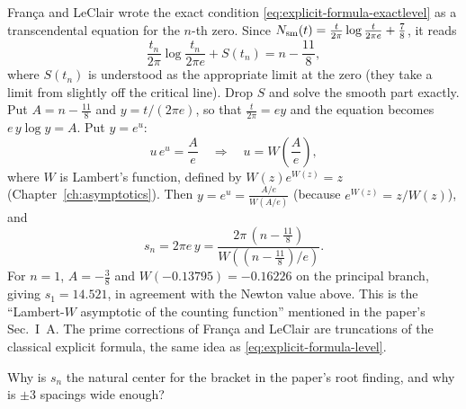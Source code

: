 Fran\c{c}a and LeClair \cite{francaleclair,leclair} wrote the exact condition \cref{eq:explicit-formula-exactlevel} as a transcendental equation for the $n$-th zero. Since $N_{\mathrm{sm}}(t)=\frac{t}{2\pi}\log\frac{t}{2\pi e}+\frac78$, it reads
\begin{equation}
\frac{t_n}{2\pi}\log\frac{t_n}{2\pi e}+S(t_n)=n-\frac{11}{8},
\label{eq:explicit-formula-fl}
\end{equation}
where $S(t_n)$ is understood as the appropriate limit at the zero (they take a limit from slightly off the critical line). Drop $S$ and solve the smooth part exactly. Put $A=n-\frac{11}{8}$ and $y=t/(2\pi e)$, so that $\frac{t}{2\pi}=ey$ and the equation becomes $e\,y\log y=A$. Put $y=e^{u}$:
\[
u\,e^{u}=\frac{A}{e}\quad\Longrightarrow\quad u=W\!\left(\frac Ae\right),
\]
where $W$ is Lambert's function, defined by $W(z)e^{W(z)}=z$ (Chapter~\ref{ch:asymptotics}). Then $y=e^{u}=\frac{A/e}{W(A/e)}$ (because $e^{W(z)}=z/W(z)$), and
\begin{equation}
s_n=2\pi e\,y=\frac{2\pi\,(n-\tfrac{11}{8})}{W\!\left((n-\tfrac{11}{8})/e\right)} .
\label{eq:explicit-formula-lambert}
\end{equation}
For $n=1$, $A=-\tfrac38$ and $W(-0.13795)=-0.16226$ on the principal branch, giving $s_1=14.521$, in agreement with the Newton value above. This is the ``Lambert-$W$ asymptotic of the counting function'' mentioned in the paper's Sec.~I~A. The prime corrections of Fran\c{c}a and LeClair are truncations of the classical explicit formula, the same idea as \cref{eq:explicit-formula-level}.

\begin{checkpoint}
Why is $s_n$ the natural center for the bracket in the paper's root finding, and why is $\pm3$ spacings wide enough?
\end{checkpoint}


